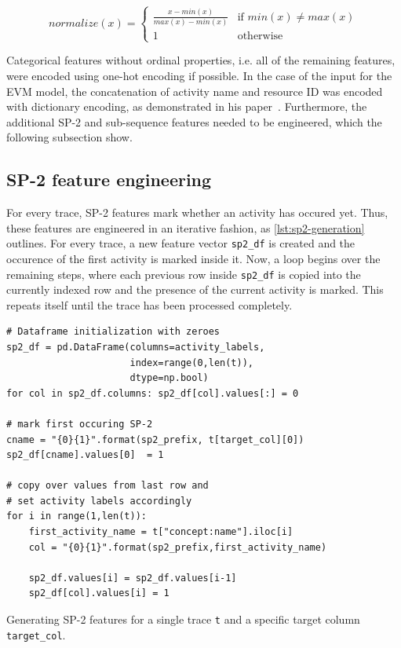 $$normalize(x) =
\begin{cases}
\frac{x-min(x)}{max(x)-min(x)} & \text{if } min(x) \neq max(x)\\
1 & \text{otherwise}
\end{cases}
$$

Categorical features without ordinal properties, i.e. all of the remaining features, were encoded using one-hot encoding if possible. In the case of the input for the EVM model, the concatenation of activity name and resource ID was encoded with dictionary encoding, as demonstrated in his paper~\cite{evermann2016}. Furthermore, the additional SP-2 and sub-sequence features needed to be engineered, which the following subsection show.

\subsection*{SP-2 feature engineering}
For every trace, SP-2 features mark whether an activity has occured yet. Thus, these features are engineered in an iterative fashion, as \autoref{lst:sp2-generation} outlines. For every trace, a new feature vector \texttt{sp2\_df} is created and the occurence of the first activity is marked inside it. Now, a loop begins over the remaining steps, where each previous row inside \texttt{sp2\_df} is copied into the currently indexed row and the presence of the current activity is marked. This repeats itself until the trace has been processed completely.

\begin{listing}[ht]
\begin{verbatim}
# Dataframe initialization with zeroes
sp2_df = pd.DataFrame(columns=activity_labels,
                      index=range(0,len(t)),
                      dtype=np.bool)
for col in sp2_df.columns: sp2_df[col].values[:] = 0

# mark first occuring SP-2
cname = "{0}{1}".format(sp2_prefix, t[target_col][0])
sp2_df[cname].values[0]  = 1

# copy over values from last row and
# set activity labels accordingly
for i in range(1,len(t)):
    first_activity_name = t["concept:name"].iloc[i]
    col = "{0}{1}".format(sp2_prefix,first_activity_name)

    sp2_df.values[i] = sp2_df.values[i-1]
    sp2_df[col].values[i] = 1
\end{verbatim}
\caption{Generating SP-2 features for a single trace \texttt{t} and a specific target column \texttt{target\_col}.}
\label{lst:sp2-generation}
\end{listing}

